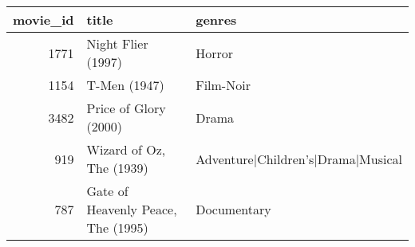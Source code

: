 \begin{tabular}{rll}
\toprule
movie_id & title & genres \\
\midrule
1771 & Night Flier (1997) & Horror \\
1154 & T-Men (1947) & Film-Noir \\
3482 & Price of Glory (2000) & Drama \\
919 & Wizard of Oz, The (1939) & Adventure|Children's|Drama|Musical \\
787 & Gate of Heavenly Peace, The (1995) & Documentary \\
\bottomrule
\end{tabular}
